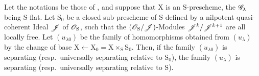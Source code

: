 \begin{proposition}[11.9.15]
\label{IV.11.9.15}
Let the notations be those of , and suppose that $\mathrm{X}$ is an $\mathrm{S}$-prescheme, the $\mathscr{G}_\lambda$ being $\mathrm{S}$-flat.
Let $\mathrm{S}_0$ be a closed sub-prescheme of $\mathrm{S}$ defined by a nilpotent quasi-coherent Ideal $\mathscr{J}$ of $\mathscr{O}_\mathrm{S}$, such that the $(\mathscr{O}_\mathrm{S}/\mathscr{J})$-Modules $\mathscr{J}^k/\mathscr{J}^{k+1}$ are all locally free.
Let $(u_{\lambda 0})$ be the family of homomorphisms obtained from $(u_\lambda)$ by the change of base $\mathrm{X}\leftarrow\mathrm{X}_0=\mathrm{X}\times_\mathrm{S}\mathrm{S}_0$.
Then, if the family $(u_{\lambda 0})$ is separating (resp.\ universally separating relative to $\mathrm{S}_0$), the family $(u_\lambda)$ is separating (resp.\ universally separating relative to $\mathrm{S}$).
\end{proposition}

